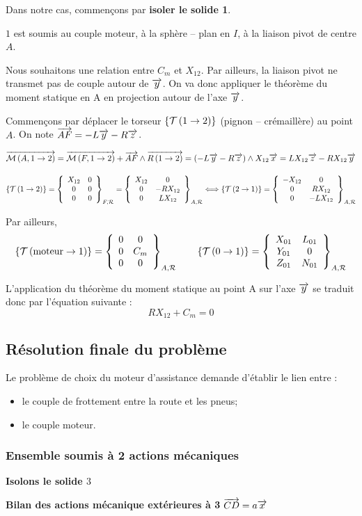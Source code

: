 \documentclass[10pt]{article}
\begin{document}
Dans notre cas, commençons par \textbf{isoler le solide 1}.

$1$ est soumis au couple moteur, à la sphère -- plan en $I$, à la liaison pivot de centre $A$.

Nous souhaitons une relation entre $C_m$ et $X_{12}$. Par ailleurs, la liaison pivot ne transmet pas de couple autour de $\vect{y}$. On va donc appliquer le théorème du moment statique en A en projection autour de l'axe $\vect{y}$.

Commençons par déplacer le torseur $\torseurstat{T}{1}{2}$ (pignon -- crémaillère) au point $A$. On note $\vect{AF}=-L\vect{y}-R\vect{z}$.


$$
\vectm{A}{1}{2} = \vectm{F}{1}{2} + \vect{AF}\wedge\vectf{1}{2} 
= \left(-L\vect{y}-R\vect{z}\right) \wedge X_{12} \vect{x}
=LX_{12}\vect{z}-RX_{12}\vect{y}
$$

$$
\torseurstat{T}{1}{2} 
=\torseurcol{X_{12}}{0}{0}{0}{0}{0}{F,\mathcal{R}}
=\torseurcol{X_{12}}{0}{0}{0}{-RX_{12}}{LX_{12}}{A,\mathcal{R}}
\Longleftrightarrow
\torseurstat{T}{2}{1} 
=\torseurcol{-X_{12}}{0}{0}{0}{RX_{12}}{-LX_{12}}{A,\mathcal{R}}
$$

Par ailleurs, 
$$
\torseurstat{T}{\text{moteur}}{1}=
\torseurcol{0}{0}{0}{0}{C_m}{0}{A,\mathcal{R}}
 \quad \quad
\torseurstat{T}{0}{1} =
\torseurcol{X_{01}}{Y_{01}}{Z_{01}}{L_{01}}{0}{N_{01}}{A,\mathcal{R}}
$$


L'application du théorème du moment statique au point A sur l'axe $\vect{y}$ se traduit donc par l'équation suivante :
$$
R X_{12} + C_m = 0
$$




\subsection{Résolution finale du problème}
Le problème de choix du moteur d'assistance demande d'établir le lien entre :
\begin{itemize}
\item le couple de frottement entre la route et les pneus;
\item le couple moteur.
\end{itemize}

\subsubsection*{Ensemble soumis à 2 actions mécaniques}
\textbf{Isolons le solide $3$}

\textbf{Bilan des actions mécanique extérieures à 3}
$\vect{CD}=a\vect{x}$
\end{document}
